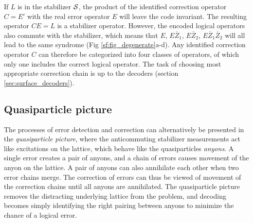 If $L$ is in the stabilizer $\mathcal{S}$, the product of the identified correction operator $C=E'$ with the real error operator $E$ will leave the code invariant. The resulting operator $CE=L$ is a stabilizer operator. However, the encoded logical operators also commute with the stabilizer, which means that $E$, $E\bar{Z}_1$, $E\bar{Z}_2$, $E\bar{Z}_1\bar{Z}_2$ will all lead to the same syndrome (Fig \ref{sf:fig_degenerate}a-d). Any identified correction operator $C$ can therefore be categorized into four classes of operators, of which only one includes the correct logical operator. The task of choosing most appropriate correction chain is up to the decoders (section \ref{sec:surface_decoders}).

\subsection{Quasiparticle picture}

The processes of error detection and correction can alternatively be presented in the \emph{quasiparticle picture}, where the anticommuting stabilizer measurements act like excitations on the lattice, which behave like the quasiparticles \emph{anyons}. A single error creates a pair of anyons, and a chain of errors causes movement of the anyon on the lattice. A pair of anyons can also annihilate each other when two error chains merge. The correction of errors can thus be viewed of movement of the correction chains until all anyons are annihilated. The quasiparticle picture removes the distracting underlying lattice from the problem, and decoding becomes simply identifying the right pairing between anyons to minimize the chance of a logical error.

